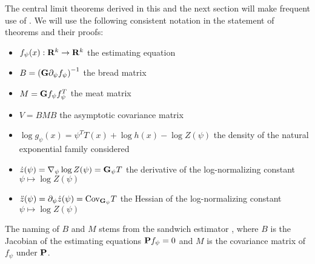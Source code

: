 \begin{notation}
    \label{not:notation-clt}
    The central limit theorems derived in this and the next section will make frequent use of . We will use the following consistent notation in the statement of theorems and their proofs:
    \begin{itemize}
        \item $f_\psi(x): \R^{k} \to \R^{k}$ the estimating equation              
        \item $B = \left(\G\partial_{\psi} f_{\psi}\right)^{-1}$ the bread matrix
        \item $M = \G f_{\psi}f_{\psi}^{T}$ the meat matrix
        \item $V = BMB$ the asymptotic covariance matrix
        \item $\log g_{\psi}(x) = \psi^{T}T(x) + \log h(x) - \log Z(\psi)$ the density of the natural exponential family considered
        \item $\dot z (\psi) = \nabla_{\psi}\log Z(\psi) = \G_{\psi} T$ the derivative of the log-normalizing constant $\psi \mapsto \log Z(\psi)$
        \item $\ddot z(\psi) = \partial_{\psi} \dot z(\psi) =\cov_{\G_{\psi}}T$ the Hessian of the log-normalizing constant $\psi \mapsto \log Z(\psi)$
    \end{itemize}
    The naming of $B$ and $M$ stems from the sandwich estimator \cite{White1982Maximum}, where $B$ is the Jacobian of the estimating equations $\P f_{\psi} = 0$ and $M$ is the covariance matrix of $f_{\psi}$ under $\P$. 
\end{notation}

\begin{theorem}
    \label{thm:ce-consistent}
\end{theorem}


